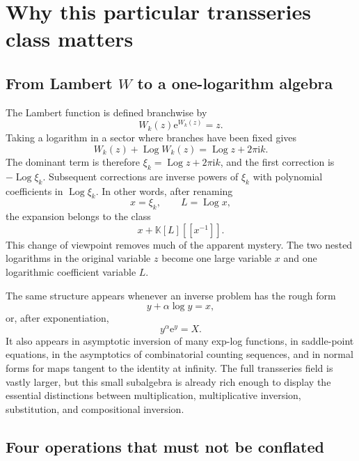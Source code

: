 \documentclass[11pt]{article}
\theoremstyle{pltheorem}
\newcommand{\K}{\mathbb K}
\newcommand{\e}{\mathrm e}
\newcommand{\ii}{\mathrm i}
\newcommand{\Log}{\operatorname{Log}}
\begin{document}
\tableofcontents
\newpage

\section{Why this particular transseries class matters}
\label{sec:motivation}

\subsection{\texorpdfstring{From Lambert \(W\) to a one-logarithm algebra}{From Lambert W to a one-logarithm algebra}}

The Lambert function is defined branchwise by
\begin{equation}\label{eq:W-definition}
 W_k(z)\e^{W_k(z)}=z.
\end{equation}
Taking a logarithm in a sector where branches have been fixed gives
\begin{equation}\label{eq:W-log-equation}
 W_k(z)+\Log W_k(z)=\Log z+2\pi\ii k.
\end{equation}
The dominant term is therefore
\(\xi_k=\Log z+2\pi\ii k\), and the first correction is
\(-\Log\xi_k\).  Subsequent corrections are inverse powers of \(\xi_k\) with polynomial coefficients in \(\Log\xi_k\).  In other words, after renaming
\[
 x=\xi_k,\qquad L=\Log x,
\]
the expansion belongs to the class
\begin{equation}\label{eq:basic-class-preview}
 x+\K[L][[x^{-1}]].
\end{equation}
This change of viewpoint removes much of the apparent mystery.  The two nested logarithms in the original variable \(z\) become one large variable \(x\) and one logarithmic coefficient variable \(L\).

The same structure appears whenever an inverse problem has the rough form
\[
 y+\alpha\log y=x,
\]
or, after exponentiation,
\[
 y^\alpha\e^y=X.
\]
It also appears in asymptotic inversion of many exp-log functions, in saddle-point equations, in the asymptotics of combinatorial counting sequences, and in normal forms for maps tangent to the identity at infinity.  The full transseries field is vastly larger, but this small subalgebra is already rich enough to display the essential distinctions between multiplication, multiplicative inversion, substitution, and compositional inversion.

\subsection{Four operations that must not be conflated}
\end{document}
